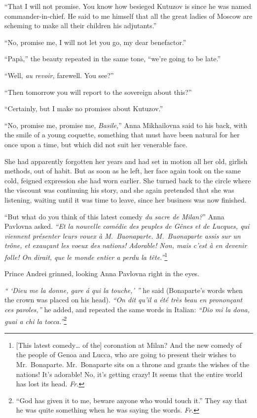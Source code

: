 ``That I will not promise. You know how besieged Kutuzov is since he was named commander-in-chief. He said to me himself that all the great ladies of Moscow are scheming to make all their children his adjutants.'' %

``No, promise me, I will not let you go, my dear benefactor.''

``Pap\`a,'' the beauty repeated in the same tone, ``we're going to be late.'' %

``Well, \textit{au revoir,} farewell. You see?'' %

``Then tomorrow you will report to the sovereign about this?'' %

``Certainly, but I make no promises about Kutuzov.'' %

``No, promise me, promise me, \textit{Basile,}'' Anna Mikhailovna said to his back, with the smile of a young coquette, something that must have been natural for her once upon a time, but which did not suit her venerable face.

She had apparently forgotten her years and had set in motion all her old, girlish methods, out of habit. But as soon as he left, her face again took on the same cold, feigned expression she had worn earlier. She turned back to the circle where the viscount was continuing his story, and she again pretended that she was listening, waiting until it was time to leave, since her business was now finished.

``But what do you think of this latest comedy \textit{du sacre de Milan?}'' Anna Pavlovna asked. \textit{``Et la nouvelle com\'edie des peuples de G\^enes et de Lucques, qui viennent pr\'esenter leurs vouex \`a M.~Buonaparte. M.~Buonaparte assis sur un tr\^one, et exau\c cant les voeux des nations! Adorable! Non, mais c'est \`a en devenir folle! On dirait, que le monde entier a perdu la t\^ete.''}\footnote{[This latest comedy\ldots{} of the] coronation at Milan? And the new comedy of the people of Genoa and Lucca, who are going to present their wishes to Mr.~Bonaparte. Mr.~Bonaparte sits on a throne and grants the wishes of the nations! It's adorable! No, it's getting crazy! It seems that the entire world has lost its head. \textit{Fr.}}

Prince Andrei grinned, looking Anna Pavlovna right in the eyes.

\textit{`` `Dieu me la donne, gare \'a qui la touche,' ''} he said (Bonaparte's words when the crown was placed on his head). \textit{``On dit qu'il a \'et\'e tr\`es beau en pronon\c cant ces paroles,''} he added, and repeated the same words in Italian: \textit{``Dio mi la dona, guai a chi la tocca.''}\footnote{``God has given it to me, beware anyone who would touch it.'' They say that he was quite something when he was saying the words. \textit{Fr.}}

